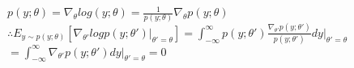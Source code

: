 \begin{answer}\\
$p(y;\theta)=\nabla_{\theta}log(y;\theta)=\frac{1}{p(y;\theta)}\nabla_{\theta}p(y;\theta)$\\
$\therefore E_{y \sim p(y;\theta)}\left [ \nabla_{\theta'} log p(y;\theta')|_{\theta'=\theta} \right]=\int_{-\infty}^{\infty}p(y;\theta')\frac{\nabla_{\theta'}p(y;\theta')}{p(y;\theta')}dy|_{\theta'=\theta}$\\
$=\int_{-\infty}^{\infty}\nabla_{\theta'}p(y;\theta')dy|_{\theta'=\theta}=0$
\end{answer}

